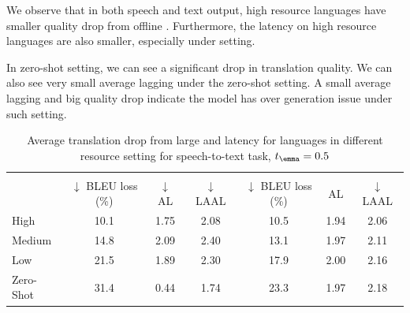 We observe that in both speech and text output,
high resource languages have smaller quality drop from offline \mfourttwo.
Furthermore, the latency on high resource languages are also smaller, especially under \xeng setting.

In zero-shot setting, we can see a significant drop in translation quality.
We can also see very small average lagging under the zero-shot setting.
A small average lagging and big quality drop indicate the model has over generation issue under such setting.

\begin{table}[!ht]
    \centering
    \small
    \begin{tabular}{@{}lcccccc@{}}
        \toprule
           &  &  \\
          \cmidrule(r){2-4}\cmidrule(l){5-7}
          & $\downarrow$ BLEU loss (\%)  &  $\downarrow$ AL &  $\downarrow$ LAAL &  $\downarrow$ BLEU loss (\%)   & AL &  $\downarrow$ LAAL \\
             \midrule
High & 10.1 & 1.75 & 2.08 & 10.5 & 1.94 & 2.06 \\
Medium & 14.8 & 2.09 & 2.40 & 13.1 & 1.97 & 2.11 \\
Low & 21.5 & 1.89 & 2.30 & 17.9 & 2.00 & 2.16 \\
Zero-Shot & 31.4 & 0.44 & 1.74 & 23.3 & 1.97 & 2.18 \\
        \bottomrule
    \end{tabular}
    \caption{Average translation drop from \mfourttwo large and latency for languages in different resource setting for speech-to-text task, $t_{\emma}=0.5$ }
    \label{tbl:streamin_s2t.resource}
\end{table}



